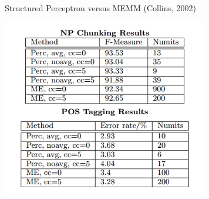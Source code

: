 \documentclass{beamer}
\begin{document}
\begin{frame}{Structured Perceptron versus MEMM (Collins, 2002) }
  \begin{center}
    \includegraphics[width=9cm]{structperc}
  \end{center}
\end{frame}
\end{document}

